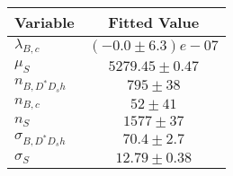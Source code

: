 \begin{tabular}[t]{lc}
\hline
Variable &Fitted Value\\
\hline\hline
$\lambda_{B,c}$&$(-0.0\pm6.3)e-07$\\
\hline
$\mu_S$&$5279.45\pm0.47$\\
\hline
$n_{B, D^* D_s h}$&$795\pm38$\\
\hline
$n_{B,c}$&$52\pm41$\\
\hline
$n_S$&$1577\pm37$\\
\hline
$\sigma_{B, D^* D_s h}$&$70.4\pm2.7$\\
\hline
$\sigma_S$&$12.79\pm0.38$\\
\hline
\end{tabular}